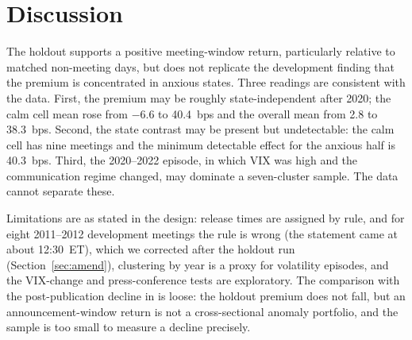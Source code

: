 \section{Discussion}
The holdout supports a positive meeting-window return, particularly relative to matched non-meeting days, but does not replicate the development finding that the premium is concentrated in anxious states. Three readings are consistent with the data. First, the premium may be roughly state-independent after 2020; the calm cell mean rose from $-6.6$ to 40.4~bps and the overall mean from 2.8 to 38.3~bps. Second, the state contrast may be present but undetectable: the calm cell has nine meetings and the minimum detectable effect for the anxious half is 40.3~bps. Third, the 2020--2022 episode, in which VIX was high and the communication regime changed, may dominate a seven-cluster sample. The data cannot separate these.

Limitations are as stated in the design: release times are assigned by rule, and for eight 2011--2012 development meetings the rule is wrong (the statement came at about 12:30~ET), which we corrected after the holdout run (Section~\ref{sec:amend}), clustering by year is a proxy for volatility episodes, and the VIX-change and press-conference tests are exploratory. The comparison with the post-publication decline in \citet{mclean2016} is loose: the holdout premium does not fall, but an announcement-window return is not a cross-sectional anomaly portfolio, and the sample is too small to measure a decline precisely.
